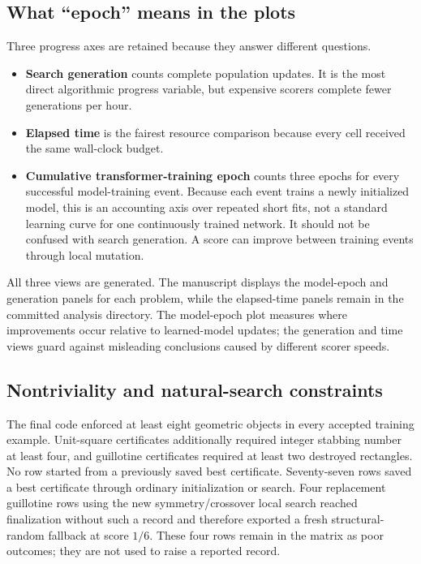 \documentclass[11pt]{article}
\begin{document}
\subsection{What ``epoch'' means in the plots}

Three progress axes are retained because they answer different questions.

\begin{itemize}
\item \textbf{Search generation} counts complete population updates.  It is
the most direct algorithmic progress variable, but expensive scorers complete
fewer generations per hour.
\item \textbf{Elapsed time} is the fairest resource comparison because every
cell received the same wall-clock budget.
\item \textbf{Cumulative transformer-training epoch} counts three epochs for
every successful model-training event.  Because each event trains a newly
initialized model, this is an accounting axis over repeated short fits, not a
standard learning curve for one continuously trained network.  It should not
be confused with search generation.  A score can improve between training
events through local mutation.
\end{itemize}

All three views are generated.  The manuscript displays the model-epoch and
generation panels for each problem, while the elapsed-time panels remain in
the committed analysis directory.  The model-epoch plot measures where
improvements occur relative to learned-model updates; the generation and time
views guard against misleading conclusions caused by different scorer speeds.

\subsection{Nontriviality and natural-search constraints}

The final code enforced at least eight geometric objects in every accepted
training example.  Unit-square certificates additionally required integer
stabbing number at least four, and guillotine certificates required at least
two destroyed rectangles.  No row started from a previously saved best
certificate.  Seventy-seven rows saved a best certificate through ordinary
initialization or search.  Four replacement guillotine rows using the new
symmetry/crossover local search reached finalization without such a record and
therefore exported a fresh structural-random fallback at score $1/6$.  These
four rows remain in the matrix as poor outcomes; they are not used to raise a
reported record.
\end{document}
